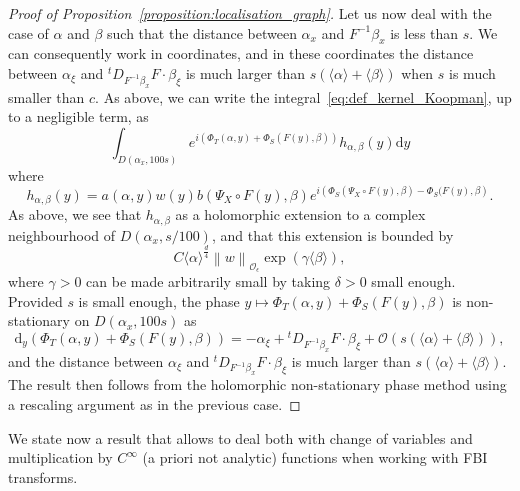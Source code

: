 \documentclass[AHL,Unicode,longabstracts,published]{cedram}
\newcommand{\p}[1]{\left(#1\right)}
\newcommand{\n}[1]{\left\|#1\right\|}
\newcommand{\brac}[1]{\langle #1 \rangle}
\newcommand{\clO}{\mathcal{O}}
\newcommand{\rmd}{\mathrm{d}}
\newcommand{\clO}{\mathcal{O}}
\begin{document}
\begin{proof}[Proof of Proposition~\ref{proposition:localisation_graph}]
Let us now deal with the case of $\alpha$ and $\beta$ such that the distance between $\alpha_x$ and $F^{-1} \beta_x$ is less than $s$. We can consequently work in coordinates, and in these coordinates the distance between $\alpha_\xi$ and ${}^t D_{F^{-1} \beta_x} F \cdot \beta_\xi$ is much larger than $s\p{\brac{\alpha} + \brac{\beta}}$ when $s$ is much smaller than $c$. As above, we can write the integral~\eqref{eq:def_kernel_Koopman}, up to a negligible term, as
\begin{equation*}
\int_{D(\alpha_x,100s)} e^{i\left(\Phi_T(\alpha,y) + \Phi_S(F(y),\beta)\right)} h_{\alpha,\beta}(y) \rmd y
\end{equation*}
where
\begin{equation*}
h_{\alpha,\beta}(y) = a(\alpha,y) w(y) b(\Psi_X \circ F(y),\beta) e^{i \left(\Phi_S(\Psi_X \circ F(y),\beta) - \Phi_S(F(y),\beta\right)}.
\end{equation*}
As above, we see that $h_{\alpha,\beta}$ as a holomorphic extension to a complex neighbourhood of $D(\alpha_x,s/100)$, and that this extension is bounded by
\begin{equation*}
C \brac{\alpha}^{\frac{d}{4}} \n{w}_{\clO_\epsilon} \exp\p{\gamma \brac{\beta}},
\end{equation*}
where $\gamma > 0$ can be made arbitrarily small by taking $\delta > 0$ small enough. Provided $s$ is small enough, the phase $y \mapsto \Phi_T(\alpha,y) + \Phi_S(F(y),\beta)$ is non-stationary on $D(\alpha_x,100s)$ as
\begin{equation*}
\rmd _y\p{\Phi_T(\alpha,y) + \Phi_S(F(y),\beta)} = - \alpha_\xi + {}^t D_{F^{-1} \beta_x}F \cdot \beta_\xi + \clO\p{s\p{\brac{\alpha} + \brac{\beta}}},
\end{equation*}
and the distance between $\alpha_\xi$ and ${}^t D_{F^{-1} \beta_x} F \cdot \beta_\xi$ is much larger than $s\p{\brac{\alpha} + \brac{\beta}}$. The result then follows from the holomorphic non-stationary phase method using a rescaling argument as in the previous case.
\end{proof}

We state now a result that allows to deal both with change of variables and multiplication by $C^\infty$ (a priori not analytic) functions when working with FBI transforms.
\end{document}
